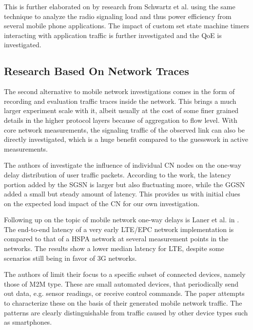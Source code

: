 This is further elaborated on by research from Schwartz et al.\cite{schwartz2013angrybirds} using the same technique to analyze the radio signaling load and thus power efficiency from several mobile phone applications. The impact of custom set state machine timers interacting with application traffic is further investigated and the \gls{QoE} is investigated.


\subsection{Research Based On Network Traces}

The second alternative to mobile network investigations comes in the form of recording and evaluation traffic traces inside the network. This brings a much larger experiment scale with it, albeit usually at the cost of some finer grained details in the higher protocol layers because of aggregation to flow level. 
With core network measurements, the signaling traffic of the observed link can also be directly investigated, which is a huge benefit compared to the guesswork in active measurements.

The authors of \cite{4675847} investigate the influence of individual \gls{CN} nodes on the one-way delay distribution of user traffic packets. According to the work, the latency portion added by the \gls{SGSN} is larger but also fluctuating more, while the \gls{GGSN} added a small but steady amount of latency. This provides us with initial clues on the expected load impact of the \gls{CN} for our own investigation.

Following up on the topic of mobile network one-way delays is Laner et al. in \cite{laner2012delaycomparison}. The end-to-end latency of a very early \gls{LTE}/\gls{EPC} network implementation is compared to that of a \gls{HSPA} network at several measurement points in the networks. The results show a lower median latency for \gls{LTE}, despite some scenarios still being in favor of \gls{3G} networks.

The authors of \cite{Shafiq:2012:FLC:2254756.2254767} limit their focus to a specific subset of connected devices, namely those of \gls{M2M} type. These are small automated devices, that periodically send out data, e.g. sensor readings, or receive control commands. The paper attempts to characterize these on the basis of their generated mobile network traffic. The patterns are clearly distinguishable from traffic caused by other device types such as smartphones.

